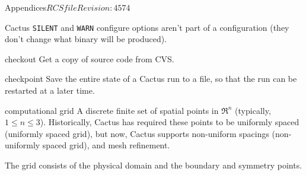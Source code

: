 \begin{cactuspart}{Appendices}{$RCSfile$}{$Revision: 4574 $}
\begin{Lentry}
  Cactus \verb|SILENT| and \verb|WARN| configure options aren't part
  of a configuration (they don't change what binary will be produced).
\item[checkout]
  Get a copy of source code from CVS.%
\item[checkpoint]
  Save the entire state of a Cactus run to a file, so that the run can be
  restarted at a later time.
\item[computational grid]
  A discrete finite set of spatial points in $\Re^n$
  (typically, $1 \le n \le 3$).
  Historically, Cactus has required these points to be uniformly spaced
  (uniformly spaced grid), but now, Cactus
  supports non-uniform spacings (non-uniformly spaced grid), and mesh refinement.

  The grid consists of the physical domain and the boundary and symmetry
  points.


\end{Lentry}
\end{cactuspart}
